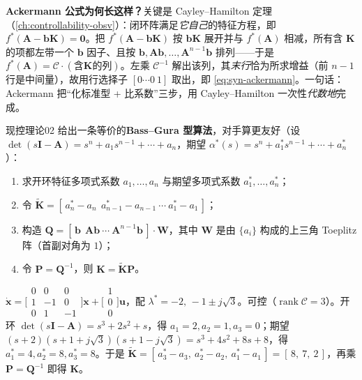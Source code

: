 \begin{insight}
\textbf{Ackermann 公式为何长这样？}\;关键是 Cayley--Hamilton 定理（\cref{ch:controllability-obsv}）：闭环阵满足\emph{它自己}的特征方程，即 $f^*(\mathbf A-\mathbf b\mathbf K)=\mathbf 0$。把 $f^*(\mathbf A-\mathbf b\mathbf K)$ 按 $\mathbf b\mathbf K$ 展开并与 $f^*(\mathbf A)$ 相减，所有含 $\mathbf K$ 的项都左带一个 $\mathbf b$ 因子、且按 $\mathbf b,\mathbf A\mathbf b,\dots,\mathbf A^{n-1}\mathbf b$ 排列——于是 $f^*(\mathbf A)=\mathcal C\cdot(\text{含}\mathbf K\text{的列})$。左乘 $\mathcal C^{-1}$ 解出该列，其\emph{末行}恰为所求增益（前 $n-1$ 行是中间量），故用行选择子 $[0\cdots0\ 1]$ 取出，即 \cref{eq:syn-ackermann}。一句话：Ackermann 把“化标准型 + 比系数”三步，用 Cayley--Hamilton 一次性\emph{代数地}完成。
\end{insight}

现控理论02 给出一条等价的\textbf{Bass--Gura 型算法}\cite{zhang2017modern}，对手算更友好（设 $\det(s\mathbf I-\mathbf A)=s^n+a_1 s^{n-1}+\cdots+a_n$，期望 $\alpha^*(s)=s^n+a^*_1 s^{n-1}+\cdots+a^*_n$）：

\begin{algo}
\label{algo:syn-bassgura}
\begin{enumerate}
  \item 求开环特征多项式系数 $a_1,\dots,a_n$ 与期望多项式系数 $a^*_1,\dots,a^*_n$；
  \item 令 $\tilde{\mathbf K}=[\,a^*_n-a_n\ \ a^*_{n-1}-a_{n-1}\ \cdots\ a^*_1-a_1\,]$；
  \item 构造 $\mathbf Q=[\,\mathbf b\ \ \mathbf A\mathbf b\ \cdots\ \mathbf A^{n-1}\mathbf b\,]\cdot\mathbf W$，其中 $\mathbf W$ 是由 $\{a_i\}$ 构成的上三角 Toeplitz 阵（首副对角为 $1$）；
  \item 令 $\mathbf P=\mathbf Q^{-1}$，则 $\mathbf K=\tilde{\mathbf K}\mathbf P$。
\end{enumerate}
\end{algo}

\begin{example}
\label{ex:syn-bassgura}
$\dot{\mathbf x}=\big[\begin{smallmatrix}0&0&0\\1&-1&0\\0&1&-1\end{smallmatrix}\big]\mathbf x+\big[\begin{smallmatrix}1\\0\\0\end{smallmatrix}\big]\mathbf u$，配 $\lambda^*=-2,\,-1\pm j\sqrt3$\cite{zhang2017modern}。可控（$\operatorname{rank}\mathcal C=3$）。开环 $\det(s\mathbf I-\mathbf A)=s^3+2s^2+s$，得 $a_1=2,a_2=1,a_3=0$；期望 $(s+2)(s+1+j\sqrt3)(s+1-j\sqrt3)=s^3+4s^2+8s+8$，得 $a^*_1=4,a^*_2=8,a^*_3=8$。于是 $\tilde{\mathbf K}=[\,a^*_3-a_3,\ a^*_2-a_2,\ a^*_1-a_1\,]=[\,8,\ 7,\ 2\,]$，再乘 $\mathbf P=\mathbf Q^{-1}$ 即得 $\mathbf K$。
\end{example}

